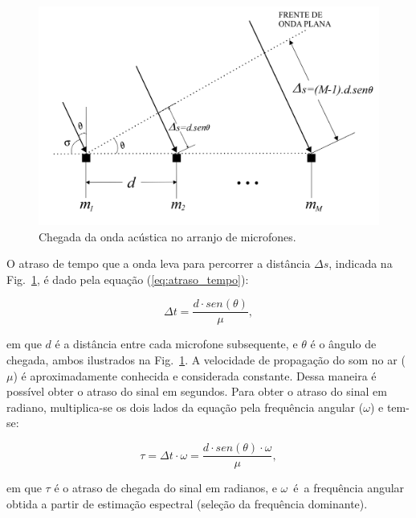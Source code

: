 \documentclass{sbrt2017port}
\begin{document}
\begin{figure}[!htb]
    \centering
    \includegraphics[width=\columnwidth]{images/DOA.png}
    \caption{Chegada da onda acústica no arranjo de microfones.}
    \label{fig:array}
\end{figure}

O atraso de tempo que a onda leva para percorrer a distância $\Delta s$, indicada na Fig.~\ref{fig:array}, é dado pela equação (\ref{eq:atraso_tempo}):
 
 \begin{equation}\label{eq:atraso_tempo}
\Delta t = \frac{d\cdot sen(\theta)}{\mu},
\end{equation}

\noindent em que $d$ é a distância entre cada microfone subsequente, e $\theta$ é o ângulo de chegada, ambos ilustrados na Fig.~\ref{fig:array}. A velocidade de propagação do som no ar ($\mu$) é aproximadamente conhecida e considerada constante. Dessa maneira é possível obter o atraso do sinal em segundos. Para obter o atraso do sinal em radiano, multiplica-se os dois lados da equação pela frequência angular ($\omega$) e tem-se:
 
\begin{equation}
\label{eq_tau}
\tau = \Delta t \cdot \omega = \frac{d\cdot sen(\theta) \cdot \omega}{\mu},
\end{equation}
 
\noindent em que $\tau$ é o atraso de chegada do sinal em radianos, e $\omega$~é~a frequência angular obtida a partir de estimação espectral (seleção da frequência dominante).

\end{document}
